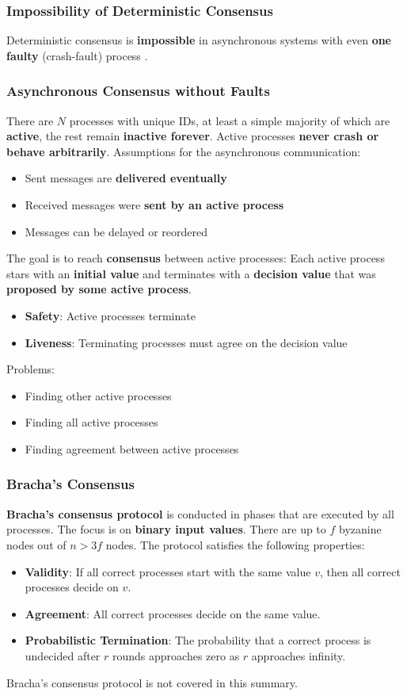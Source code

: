 \documentclass[12pt,A4]{extarticle}
\newcommand{\highlight}[1]{\textcolor{highlightColor}{\textbf{#1}}}
\begin{document}
\subsubsection{Impossibility of Deterministic Consensus}
Deterministic consensus is \textbf{impossible} in asynchronous systems with even \textbf{one faulty} (crash-fault) process \cite{impossibilityDistributedConsensus}.

\subsubsection{Asynchronous Consensus without Faults}
There are $N$ processes with unique IDs, at least a simple majority of which are \textbf{active}, the rest remain \textbf{inactive forever}. Active processes \textbf{never crash or behave arbitrarily}. Assumptions for the asynchronous communication:
\begin{itemize}
  \item{Sent messages are \textbf{delivered eventually}}
  \item{Received messages were \textbf{sent by an active process}}
  \item{Messages can be delayed or reordered}
\end{itemize}
The goal is to reach \highlight{consensus} between active processes: Each active process stars with an \textbf{initial value} and terminates with a \textbf{decision value} that was \textbf{proposed by some active process}.
\begin{itemize}
  \item{\highlight{Safety}: Active processes terminate}
  \item{\highlight{Liveness}: Terminating processes must agree on the decision value}
\end{itemize}
Problems:
\begin{itemize}
  \item{Finding other active processes}
  \item{Finding all active processes}
  \item{Finding agreement between active processes}
\end{itemize}

\subsubsection{Bracha's Consensus}
\textbf{Bracha's consensus protocol} is conducted in phases that are executed by all processes. The focus is on \textbf{binary input values}. There are up to $f$ byzanine nodes out of $n > 3f$ nodes. The protocol satisfies the following properties:
\begin{itemize}
  \item \highlight{Validity}: If all correct processes start with the same value $v$, then all correct processes decide on $v$.
  \item \highlight{Agreement}: All correct processes decide on the same value.
  \item \highlight{Probabilistic Termination}: The probability that a correct process is undecided after $r$ rounds approaches zero as $r$ approaches infinity.
\end{itemize}
Bracha's consensus protocol is not covered in this summary.
\end{document}
